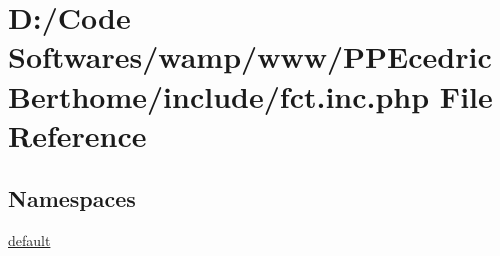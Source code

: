 \hypertarget{include_2fct_8inc_8php}{}\section{D\+:/\+Code Softwares/wamp/www/\+P\+P\+Ecedric\+Berthome/include/fct.inc.\+php File Reference}
\label{include_2fct_8inc_8php}
\subsection*{Namespaces}
\begin{DoxyCompactItemize}
\item 
 \hyperlink{namespacedefault}{default}
\end{DoxyCompactItemize}
